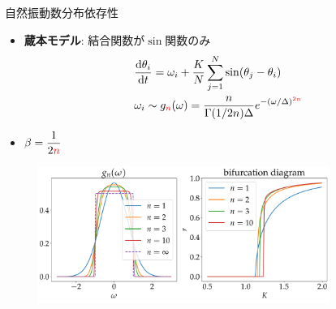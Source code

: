 %

\begin{frame}{自然振動数分布依存性}
\begin{itemize}
  \item \textbf{蔵本モデル}: 結合関数が$\sin$関数のみ
\begin{align*}
  &\frac{\mathrm{d}\theta_{i}}{\mathrm{d} t}=\omega_{i}+\frac{K}{N}\sum_{j=1}^{N}\sin(\theta_{j}-\theta_{i})\\
  &\omega_{i}\sim g_{\color{red}n}(\omega)=\frac{n}{\Gamma(1/2n)\Delta}e^{-(\omega/\Delta)^{\color{red}2n}}
\end{align*}
  \item $\beta=\dfrac{1}{2\textcolor{red}{n}}$
\end{itemize}

\begin{figure}
  \centering
  \includegraphics[width=0.85\textwidth]{figs/gn_branch.pdf}
\end{figure}

\end{frame}

